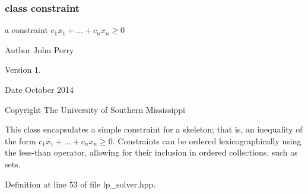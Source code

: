 \subsubsection{class constraint}
a constraint $ c_1 x_1 + \ldots + c_n x_n \geq 0 $ 

\begin{DoxyAuthor}{Author}
John Perry 
\end{DoxyAuthor}
\begin{DoxyVersion}{Version}
1. 
\end{DoxyVersion}
\begin{DoxyDate}{Date}
October 2014 
\end{DoxyDate}
\begin{DoxyCopyright}{Copyright}
The University of Southern Mississippi
\end{DoxyCopyright}
This class encapsulates a simple constraint for a skeleton; that is, an inequality of the form $ c_1 x_1 + \ldots + c_n x_n \geq 0 $. Constraints can be ordered lexicographically using the less-\/than operator, allowing for their inclusion in ordered collections, such as sets. 

Definition at line 53 of file lp\+\_\+solver.\+hpp.

